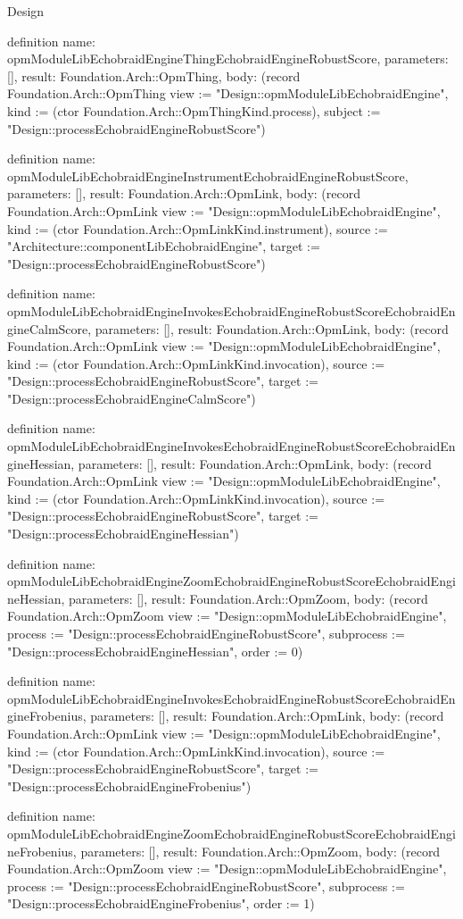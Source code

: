 \begin{lexlean}{Design}
\begin{semanticmodule}
definition{
  name: opmModuleLibEchobraidEngineThingEchobraidEngineRobustScore,
  parameters: [],
  result: Foundation.Arch::OpmThing,
  body: (record Foundation.Arch::OpmThing {view := "Design::opmModuleLibEchobraidEngine", kind := (ctor Foundation.Arch::OpmThingKind.process), subject := "Design::processEchobraidEngineRobustScore"})
}

definition{
  name: opmModuleLibEchobraidEngineInstrumentEchobraidEngineRobustScore,
  parameters: [],
  result: Foundation.Arch::OpmLink,
  body: (record Foundation.Arch::OpmLink {view := "Design::opmModuleLibEchobraidEngine", kind := (ctor Foundation.Arch::OpmLinkKind.instrument), source := "Architecture::componentLibEchobraidEngine", target := "Design::processEchobraidEngineRobustScore"})
}

definition{
  name: opmModuleLibEchobraidEngineInvokesEchobraidEngineRobustScoreEchobraidEngineCalmScore,
  parameters: [],
  result: Foundation.Arch::OpmLink,
  body: (record Foundation.Arch::OpmLink {view := "Design::opmModuleLibEchobraidEngine", kind := (ctor Foundation.Arch::OpmLinkKind.invocation), source := "Design::processEchobraidEngineRobustScore", target := "Design::processEchobraidEngineCalmScore"})
}

definition{
  name: opmModuleLibEchobraidEngineInvokesEchobraidEngineRobustScoreEchobraidEngineHessian,
  parameters: [],
  result: Foundation.Arch::OpmLink,
  body: (record Foundation.Arch::OpmLink {view := "Design::opmModuleLibEchobraidEngine", kind := (ctor Foundation.Arch::OpmLinkKind.invocation), source := "Design::processEchobraidEngineRobustScore", target := "Design::processEchobraidEngineHessian"})
}

definition{
  name: opmModuleLibEchobraidEngineZoomEchobraidEngineRobustScoreEchobraidEngineHessian,
  parameters: [],
  result: Foundation.Arch::OpmZoom,
  body: (record Foundation.Arch::OpmZoom {view := "Design::opmModuleLibEchobraidEngine", process := "Design::processEchobraidEngineRobustScore", subprocess := "Design::processEchobraidEngineHessian", order := 0})
}

definition{
  name: opmModuleLibEchobraidEngineInvokesEchobraidEngineRobustScoreEchobraidEngineFrobenius,
  parameters: [],
  result: Foundation.Arch::OpmLink,
  body: (record Foundation.Arch::OpmLink {view := "Design::opmModuleLibEchobraidEngine", kind := (ctor Foundation.Arch::OpmLinkKind.invocation), source := "Design::processEchobraidEngineRobustScore", target := "Design::processEchobraidEngineFrobenius"})
}

definition{
  name: opmModuleLibEchobraidEngineZoomEchobraidEngineRobustScoreEchobraidEngineFrobenius,
  parameters: [],
  result: Foundation.Arch::OpmZoom,
  body: (record Foundation.Arch::OpmZoom {view := "Design::opmModuleLibEchobraidEngine", process := "Design::processEchobraidEngineRobustScore", subprocess := "Design::processEchobraidEngineFrobenius", order := 1})
}


\end{semanticmodule}
\end{lexlean}
